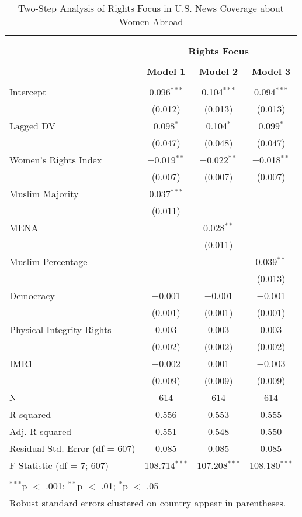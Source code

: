 
\begin{table}[!htbp] \centering 
  \caption{Two-Step Analysis of Rights Focus in U.S. News Coverage about Women Abroad} 
  \label{table:heckit} 
\begin{tabular}{@{\extracolsep{5pt}}lccc} 
\\[-1.8ex]\hline \\[-1.8ex] 
\\[-1.8ex] & \multicolumn{3}{c}{\textbf{Rights Focus}} \\ 
\\[-1.8ex] & \textbf{Model 1} & \textbf{Model 2} & \textbf{Model 3}\\ 
\hline \\[-1.8ex] 
 Intercept & 0.096$^{***}$ & 0.104$^{***}$ & 0.094$^{***}$ \\ 
  & (0.012) & (0.013) & (0.013) \\ 
  Lagged DV & 0.098$^{*}$ & 0.104$^{*}$ & 0.099$^{*}$ \\ 
  & (0.047) & (0.048) & (0.047) \\ 
  Women's Rights Index & $-$0.019$^{**}$ & $-$0.022$^{**}$ & $-$0.018$^{**}$ \\ 
  & (0.007) & (0.007) & (0.007) \\ 
  Muslim Majority & 0.037$^{***}$ &  &  \\ 
  & (0.011) &  &  \\ 
  MENA &  & 0.028$^{**}$ &  \\ 
  &  & (0.011) &  \\ 
  Muslim Percentage &  &  & 0.039$^{**}$ \\ 
  &  &  & (0.013) \\ 
  Democracy & $-$0.001 & $-$0.001 & $-$0.001 \\ 
  & (0.001) & (0.001) & (0.001) \\ 
  Physical Integrity Rights & 0.003 & 0.003 & 0.003 \\ 
  & (0.002) & (0.002) & (0.002) \\ 
  IMR1 & $-$0.002 & 0.001 & $-$0.003 \\ 
  & (0.009) & (0.009) & (0.009) \\ 
 N & 614 & 614 & 614 \\ 
R-squared & 0.556 & 0.553 & 0.555 \\ 
Adj. R-squared & 0.551 & 0.548 & 0.550 \\ 
Residual Std. Error (df = 607) & 0.085 & 0.085 & 0.085 \\ 
F Statistic (df = 7; 607) & 108.714$^{***}$ & 107.208$^{***}$ & 108.180$^{***}$ \\ 
\hline \\[-1.8ex] 
\multicolumn{4}{l}{$^{***}$p $<$ .001; $^{**}$p $<$ .01; $^{*}$p $<$ .05} \\ 
\multicolumn{4}{l}{Robust standard errors clustered on country appear in parentheses.} \\ 
\end{tabular} 
\end{table} 
